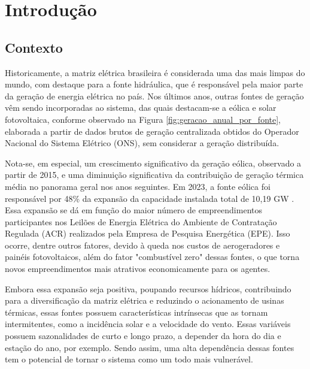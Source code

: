 \chapter{Introdução}
\sloppy																													%

\section{Contexto}
Historicamente, a matriz elétrica brasileira é considerada uma das mais limpas do mundo, com destaque para a fonte
hidráulica, que é responsável pela maior parte da geração de energia elétrica no país. Nos últimos anos, outras fontes
de geração vêm sendo incorporadas ao sistema, das quais destacam-se a eólica e solar fotovoltaica, conforme observado na
Figura \ref{fig:geracao_anual_por_fonte}, elaborada a partir de dados brutos de geração centralizada obtidos do Operador
Nacional do Sistema Elétrico (ONS), sem considerar a geração distribuída.

\begin{figure}[!ht]
	{}
	{}
\end{figure}

Nota-se, em especial, um crescimento significativo da geração eólica, observado a partir de 2015, e uma diminuição 
significativa da contribuição de geração térmica média no panorama geral nos anos seguintes. Em 2023, a fonte eólica 
foi responsável por 48\% da expansão da capacidade instalada total de 10,19 GW \cite{EPE2024}. Essa expansão se dá em 
função do maior número de empreendimentos participantes nos Leilões de Energia Elétrica do Ambiente de Contratação 
Regulada (ACR) realizados pela Empresa de Pesquisa Energética (EPE). Isso ocorre, dentre outros fatores, devido à queda 
nos custos de aerogeradores e painéis fotovoltaicos, além do fator "combustível zero" dessas fontes, o que torna novos 
empreendimentos mais atrativos economicamente para os agentes.

Embora essa expansão seja positiva, poupando recursos hídricos, contribuindo para a diversificação da matriz elétrica e
reduzindo o acionamento de usinas térmicas, essas fontes possuem características intrínsecas que as tornam intermitentes,
como a incidência solar e a velocidade do vento. Essas variáveis possuem sazonalidades de curto e longo prazo, a 
depender da hora do dia e estação do ano, por exemplo. Sendo assim, uma alta dependência dessas fontes tem o potencial
de tornar o sistema como um todo mais vulnerável.

